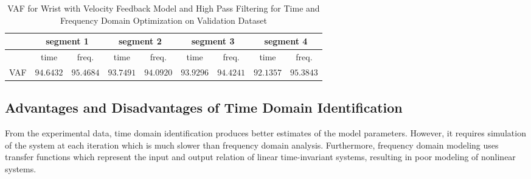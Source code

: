 \documentclass[11pt,a4paper]{article}
\begin{document}
\begin{table}
    \centering
    \begin{tabular}{|l|r|r|r|r|r|r|r|r|}
        \hline
        \nonumber &
            \multicolumn{2}{c|}{segment 1} &
            \multicolumn{2}{c|}{segment 2} &
            \multicolumn{2}{c|}{segment 3} &
            \multicolumn{2}{c|}{segment 4} \\
        \hline
        \nonumber &
            \multicolumn{1}{c|}{time} & \multicolumn{1}{c|}{freq.} &
            \multicolumn{1}{c|}{time} & \multicolumn{1}{c|}{freq.} &
            \multicolumn{1}{c|}{time} & \multicolumn{1}{c|}{freq.} &
            \multicolumn{1}{c|}{time} & \multicolumn{1}{c|}{freq.} \\
        \hline
        VAF &
            $94.6432$ & $95.4684$ & $93.7491$ & $94.0920$ &
            $93.9296$ & $94.4241$ & $92.1357$ & $95.3843$ \\
        \hline
    \end{tabular}
    \caption{VAF for Wrist with Velocity Feedback Model and High Pass
        Filtering for Time and Frequency Domain Optimization on Validation
        Dataset}
    \label{tab:segvafver}
\end{table}

\subsection{Advantages and Disadvantages of Time Domain Identification}
From the experimental data, time domain identification produces better
estimates of the model parameters. However, it requires simulation of the
system at each iteration which is much slower than frequency domain analysis.
Furthermore, frequency domain modeling uses transfer functions which represent
the input and output relation of linear time-invariant systems, resulting in
poor modeling of nonlinear systems.
\end{document}

